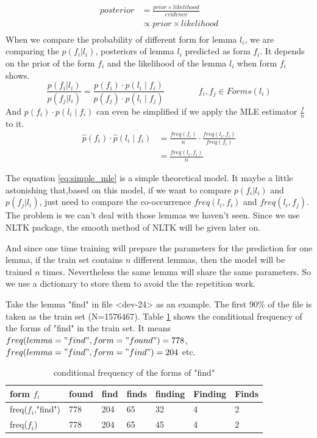 \documentclass[a4paper]{article}
\begin{document}
\begin{align*}
posterior  &= \frac{prior \times likelihood}{evidence} \\
           &\propto  prior \times likelihood \\
\end{align*}
When we compare the probability of different form for lemma $l_i$, we are comparing the $p(f_i|l_i)$, posteriors  of lemma $l_i$ predicted as form $f_i$. It depends on the prior of the form $f_i$ and the likelihood of the lemma $l_i$ when form $f_i$ shows.
\begin{equation}
\frac{p(f_i|l_i)}{p(f_j|l_i)} = \frac{p(f_i) \cdot p(l_i \mid f_i)}{  p(f_j) \cdot p(l_i \mid f_j) } \qquad \qquad  f_i,f_j \in Forms(l_i)
\end{equation}
And $p(f_i) \cdot p(l_i \mid f_i)$ can even be simplified if we apply the MLE estimator $\frac{f}{n}$ to it.
\begin{equation} 
\label{eq:simple_mle}
\begin{aligned}
\hat{p}(f_i) \cdot \hat{p}(l_i \mid f_i) &= \frac{freq(f_i)}{n} \cdot \frac{freq(l_i, f_i)}{freq(f_i)} \\
&= \frac{freq(l_i, f_i)}{n}
\end{aligned}
\end{equation}

The equation \ref{eq:simple_mle} is a simple theoretical model. It maybe a little astonishing that,based on this model, if we want to compare $p(f_i|l_i)$ and $p(f_j|l_i)$, just need to compare the co-occurrence $freq(l_i,f_i)$ and $freq(l_i,f_j)$.  The problem is we can't deal with those lemmas we haven't seen. Since we use NLTK package, the smooth method of NLTK will be given later on. 

And since one time training will prepare the parameters for the prediction for one lemma, if the train set contains $n$ different lemmas, then the model will be trained $n$ times. Nevertheless the same lemma will share the same parameters. So we use a dictionary to store them to avoid the the repetition work.


Take the lemma "find" in file <dev-24> as an example. The first 90\% of the file is taken as the train set (N=1576467). Table \ref{tb:cfd_find} shows the conditional frequency of the forms of "find" in the train set. It means $freq(lemma="find", form="found")=778$, $freq(lemma="find",form="find")=204$ etc.

\begin{table}[htb]
\centering
\begin{tabular}{|l|llllll|}
\hline
form $f_i$       & found & find & finds & finding & Finding & Finds \\ \hline
freq($f_i$,"find") & 778   & 204  & 65    & 32      & 4       & 2     \\ \hline
freq($f_i$) & 778   & 204  & 65    & 45      & 4       & 2     \\ \hline
\end{tabular}
\caption{conditional frequency of the forms of "find"}
\label{tb:cfd_find}
\end{table}
\end{document}
